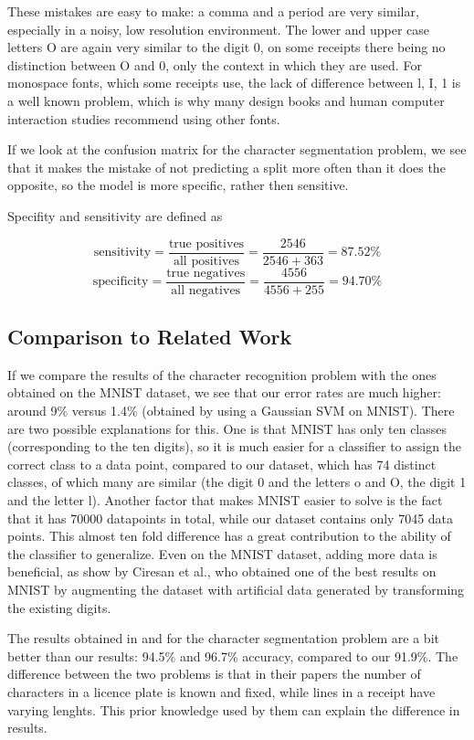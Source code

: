 These mistakes are easy to make: a comma and a period are very similar, especially in a noisy, low resolution environment. The lower and upper case letters O are again very similar to the digit 0, on some receipts there being no distinction between O and 0, only the context in which they are used. For monospace fonts, which some receipts use, the lack of difference between l, I, 1 is a well known problem, which is why many design books and human computer interaction studies recommend using other fonts\cite{chaparro2006examining}. 

If we look at the confusion matrix for the character segmentation problem, we see that it makes the mistake of not predicting a split more often than it does the opposite, so the model is more specific, rather then sensitive. 

Specifity and sensitivity are defined as\cite{Fawcett_2006}

\[
    \text{sensitivity} = \frac{\text{true positives}}{\text{all positives}} = \frac{2546}{2546+363} = 87.52 \%
\]
\[
    \text{specificity} = \frac{\text{true negatives}}{\text{all negatives}} = \frac{4556}{4556+255} =  94.70 \%
\]

\subsection{Comparison to Related Work}
If we compare the results of the character recognition problem with the ones obtained on the MNIST dataset\cite{lecun1998mnist}, we see that our error rates are much higher: around 9\% versus 1.4\% (obtained by using a Gaussian SVM on MNIST). There are two possible explanations for this. One is that MNIST has only ten classes (corresponding to the ten digits), so it is much easier for a classifier to assign the correct class to a data point, compared to our dataset, which has 74 distinct classes, of which many are similar (the digit 0 and the letters o and O, the digit 1 and the letter l). Another factor that makes MNIST easier to solve is the fact that it has 70000 datapoints in total, while our dataset contains only 7045 data points. This almost ten fold difference has a great contribution to the ability of the classifier to generalize. Even on the MNIST dataset, adding more data is beneficial, as show by Ciresan et al.\cite{Cire_an_2010}, who obtained one of the best results on MNIST by augmenting the dataset with artificial data generated by transforming the existing digits. 

The results obtained in \cite{kahraman2003license} and \cite{Franc_2005} for the character segmentation problem are a bit better than our results: 94.5\% and 96.7\% accuracy, compared to our 91.9\%. The difference between the two problems is that in their papers the number of characters in a licence plate is known and fixed, while lines in a receipt have varying lenghts. This prior knowledge used by them can explain the difference in results. 

